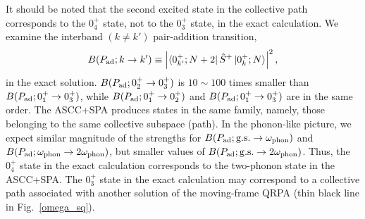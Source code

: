 \documentclass[11pt]{book} %
\begin{document}
It should be noted that the second excited state in the collective path
corresponds to the $0_4^+$ state,
not to the $0_3^+$ state, in the exact calculation. 
We examine the interband $(k\neq k')$ pair-addition transition,
\begin{equation}
B(P_{\rm ad};k\rightarrow k') \equiv 
	\left|\bra{0_{k'}^+;N+2} \hat{S}^+ \ket{0_k^+;N}\right|^2 ,
\label{BPad}
\end{equation}
in the exact solution.
$B(P_{\rm ad};0_2^+\rightarrow 0_3^+)$ 
is $10\sim100$ times smaller than $B(P_{\rm ad};0_1^+\rightarrow 0_3^+)$,
while $B(P_{\rm ad};0_1^+\rightarrow 0_2^+)$ and
$B(P_{\rm ad};0_1^+\rightarrow 0_3^+)$ are in the same order.
The ASCC+SPA produces states in the same family,
namely, those belonging to the same collective subspace (path).
In the phonon-like picture,
we expect similar magnitude of the strengths for
$B(P_{\rm ad};{\rm g.s.}\rightarrow \omega_{\rm phon})$
and
$B(P_{\rm ad};\omega_{\rm phon}\rightarrow 2\omega_{\rm phon})$,
but smaller values of
$B(P_{\rm ad};{\rm g.s.}\rightarrow 2\omega_{\rm phon})$.
Thus, the $0_4^+$ state in the exact calculation
corresponds to the two-phonon state in the ASCC+SPA.
The $0_3^+$ state in the exact calculation may correspond to
a collective path associated with another solution of the moving-frame QRPA
(thin black line in Fig.~\ref{omega_sq}).

\end{document}
